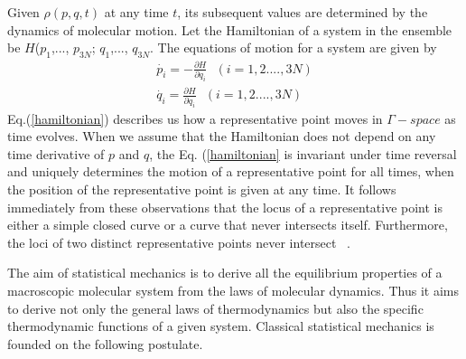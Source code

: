 Given $\rho (p, q, t)$ at any time $t$, its subsequent values are determined by the dynamics of molecular motion. Let the Hamiltonian of a system in the ensemble be ${H}$($p_1$,..., $p_{3N}$; $q_1$,..., $q_{3N}$. The equations of motion for a system are given
by
\begin{eqnarray}\label{hamiltonian}
\dot{p_i} = -\frac{\partial {H}} {\partial q_i}~~~ (i = 1, 2  ...., 3N)\nonumber\\
\dot{q_i} = \frac{\partial {H}} {\partial q_i}~~~ (i = 1, 2  ...., 3N) 
\end{eqnarray}
Eq.(\ref{hamiltonian}) describes us   how a representative point moves in $\Gamma-space$ as time evolves. When we assume that the Hamiltonian does not depend on any time derivative of $p$ and $q$, the Eq. (\ref{hamiltonian} is invariant under time reversal and uniquely determines the motion of a representative point for all times, when the position of the representative point is given at any time. It follows immediately from these observations that the locus of a representative point is either a simple
closed curve or a curve that never intersects itself. Furthermore, the loci of two distinct representative points never intersect ~\citep{huang2009}.

The aim of statistical mechanics is to derive all the equilibrium properties of
a macroscopic molecular system from the laws of molecular dynamics. Thus it
aims to derive not only the general laws of thermodynamics but also the specific
thermodynamic functions of a given system. Classical statistical mechanics is founded on the following postulate.

